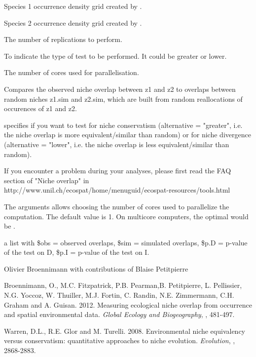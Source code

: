 \documentclass[a4paper]{book}
\begin{document}
%
\begin{Arguments}
\begin{ldescription}
\item[\code{z1}] Species 1 occurrence density grid created by .
\item[\code{z2}] Species 2 occurrence density grid created by .
\item[\code{rep}] The number of replications to perform.
\item[\code{alternative}] To indicate the type of test to be performed. It could be greater or lower.
\item[\code{ncores}] The number of cores used for parallelisation.

\end{ldescription}
\end{Arguments}
%
\begin{Details}\relax
Compares the observed niche overlap between z1 and z2 to overlaps between random niches z1.sim and z2.sim, which are built from random reallocations of occurences of z1 and z2.

 specifies if you want to test for niche conservatism (alternative = "greater", i.e. the niche overlap is more equivalent/similar than random) or for niche divergence (alternative = "lower", i.e. the niche overlap is less equivalent/similar than random). 

If you encounter a problem during your analyses, please first read the FAQ section of "Niche overlap" in http://www.unil.ch/ecospat/home/menuguid/ecospat-resources/tools.html

The arguments  allows choosing the number of cores used to parallelize the computation.  The default value is 1. On multicore computers, the optimal would be .
\end{Details}
%
\begin{Value}
a list with \$obs = observed overlaps, \$sim = simulated overlaps, \$p.D = p-value of the test on D, \$p.I = p-value of the test on I.
\end{Value}
%
\begin{Author}\relax
Olivier Broennimann  with contributions of Blaise Petitpierre 
\end{Author}
%
\begin{References}\relax
Broennimann, O., M.C. Fitzpatrick, P.B. Pearman,B.  Petitpierre, L. Pellissier, N.G. Yoccoz, W. Thuiller, M.J. Fortin, C. Randin, N.E. Zimmermann, C.H. Graham and A. Guisan. 2012. Measuring ecological niche overlap from occurrence and spatial environmental data. \emph{Global Ecology and Biogeography}, , 481-497.

Warren, D.L., R.E. Glor and M. Turelli. 2008. Environmental niche equivalency versus conservatism: quantitative approaches to niche evolution. \emph{Evolution}, , 2868-2883.
\end{References}
\end{document}

